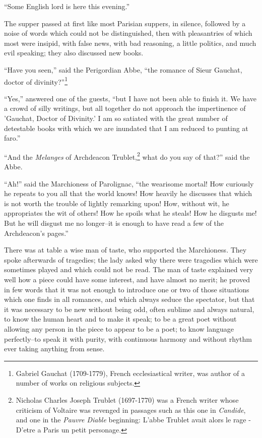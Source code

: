 ``Some English lord is here this evening.''

The supper passed at first like most Parisian suppers, in silence, followed by a noise of words which could not be distinguished, then with pleasantries of which most were insipid, with false news, with bad reasoning, a little politics, and much evil speaking; they also discussed new books.

``Have you seen,'' said the Perigordian Abbe, ``the romance of Sieur Gauchat, doctor of divinity?''\footnote{Gabriel Gauchat (1709-1779), French ecclesiastical writer, was author of a number of works on religious subjects.}

``Yes,'' answered one of the guests, ``but I have not been able to finish it. We have a crowd of silly writings, but all together do not approach the impertinence of 'Gauchat, Doctor of Divinity.' I am so satiated with the great number of detestable books with which we are inundated that I am reduced to punting at faro.''

``And the \textit{Melanges} of Archdeacon Trublet,\footnote{Nicholas Charles Joseph Trublet (1697-1770) was a French writer whose criticism of Voltaire was revenged in passages such as this one in \textit{Candide}, and one in the \textit{Pauvre Diable} beginning: L'abbe Trublet avait alors le rage - D'etre a Paris un petit personage.} what do you say of that?'' said the Abbe.

``Ah!'' said the Marchioness of Parolignac, ``the wearisome mortal! How curiously he repeats to you all that the world knows! How heavily he discusses that which is not worth the trouble of lightly remarking upon! How, without wit, he appropriates the wit of others! How he spoils what he steals! How he disgusts me! But he will disgust me no longer--it is enough to have read a few of the Archdeacon's pages.''

There was at table a wise man of taste, who supported the Marchioness. They spoke afterwards of tragedies; the lady asked why there were tragedies which were sometimes played and which could not be read. The man of taste explained very well how a piece could have some interest, and have almost no merit; he proved in few words that it was not enough to introduce one or two of those situations which one finds in all romances, and which always seduce the spectator, but that it was necessary to be new without being odd, often sublime and always natural, to know the human heart and to make it speak; to be a great poet without allowing any person in the piece to appear to be a poet; to know language perfectly--to speak it with purity, with continuous harmony and without rhythm ever taking anything from sense.

